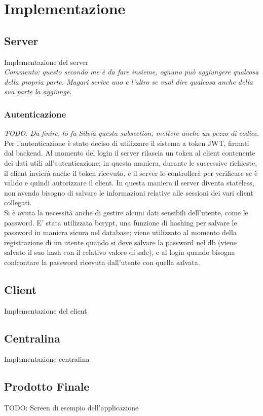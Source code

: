 

\chapter{Implementazione}
\section{Server}
Implementazione del server\\
\textit{Commento: questo secondo me è da fare insieme, ognuno può aggiungere qualcosa della propria parte. Magari scrive uno e l'altro se vuol dire qualcosa anche della sua parte la aggiunge.}

\subsection{Autenticazione}
\textit{TODO: Da finire, lo fa Silvia questa subsection, mettere anche un pezzo di codice}.\\ 
Per l'autenticazione è stato deciso di utilizzare il sistema a token JWT, firmati dal backend. Al momento
del login il server rilascia un token al client contenente dei dati
utili all’autenticazione; in questa maniera, durante le successive richieste,
il client invierà anche il token ricevuto, e il server lo controllerà per verificare
se è valido e quindi autorizzare il client. In questa maniera il server
diventa stateless, non avendo bisogno di salvare le informazioni relative
alle sessioni dei vari client collegati.\\

Si è avuta la necessità anche di gestire alcuni dati sensibili dell'utente, come le password. E' stata utilizzata bcrypt, una funzione di hashing per salvare le password in maniera sicura
nel database; viene utilizzato al momento della registrazione di un utente
quando si deve salvare la password nel db (viene salvato il suo hash con il
relativo valore di sale), e al login quando bisogna confrontare la password
ricevuta dall’utente con quella salvata. 



\section{Client}
Implementazione del client

\section{Centralina}
Implementazione centralina


\section{Prodotto Finale}
TODO: Screen di esempio dell'applicazione